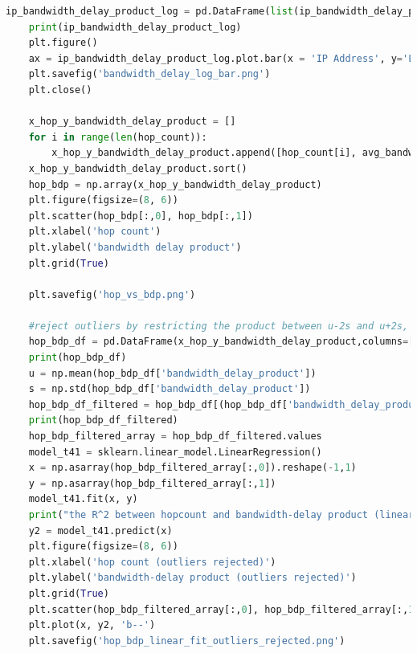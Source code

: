 \documentclass[paper=a4, fontsize=10pt]{scrartcl} %
\numberwithin{equation}{section} %
\numberwithin{figure}{section} %
\numberwithin{table}{section} %
\begin{document}
\begin{lstlisting}[language = python]
    ip_bandwidth_delay_product_log = pd.DataFrame(list(ip_bandwidth_delay_product_log_dic.items()), columns=['IP Address', 'Log of Bandwidth Delay Product(kbps)'])
    print(ip_bandwidth_delay_product_log)
    plt.figure()
    ax = ip_bandwidth_delay_product_log.plot.bar(x = 'IP Address', y='Log of Bandwidth Delay Product(kbps)', fontsize=6, figsize=(15, 15))
    plt.savefig('bandwidth_delay_log_bar.png')
    plt.close()
    
    x_hop_y_bandwidth_delay_product = []
    for i in range(len(hop_count)):
        x_hop_y_bandwidth_delay_product.append([hop_count[i], avg_bandwidth[i]*avg_delay[i]/1000])
    x_hop_y_bandwidth_delay_product.sort()
    hop_bdp = np.array(x_hop_y_bandwidth_delay_product)
    plt.figure(figsize=(8, 6))
    plt.scatter(hop_bdp[:,0], hop_bdp[:,1])
    plt.xlabel('hop count')
    plt.ylabel('bandwidth delay product')
    plt.grid(True)
    
    plt.savefig('hop_vs_bdp.png')
    
    #reject outliers by restricting the product between u-2s and u+2s, of which u is the average product and s is the standard s
    hop_bdp_df = pd.DataFrame(x_hop_y_bandwidth_delay_product,columns=['hop_count', 'bandwidth_delay_product'])
    print(hop_bdp_df)
    u = np.mean(hop_bdp_df['bandwidth_delay_product'])
    s = np.std(hop_bdp_df['bandwidth_delay_product'])
    hop_bdp_df_filtered = hop_bdp_df[(hop_bdp_df['bandwidth_delay_product']>u-2*s)&(hop_bdp_df['bandwidth_delay_product']<u+2*s)]
    print(hop_bdp_df_filtered)
    hop_bdp_filtered_array = hop_bdp_df_filtered.values
    model_t41 = sklearn.linear_model.LinearRegression()
    x = np.asarray(hop_bdp_filtered_array[:,0]).reshape(-1,1)
    y = np.asarray(hop_bdp_filtered_array[:,1])
    model_t41.fit(x, y)
    print("the R^2 between hopcount and bandwidth-delay product (linear regression, outlier rejected) is",model_t41.score(x,y))
    y2 = model_t41.predict(x)
    plt.figure(figsize=(8, 6))
    plt.xlabel('hop count (outliers rejected)')
    plt.ylabel('bandwidth-delay product (outliers rejected)')
    plt.grid(True)
    plt.scatter(hop_bdp_filtered_array[:,0], hop_bdp_filtered_array[:,1])
    plt.plot(x, y2, 'b--')
    plt.savefig('hop_bdp_linear_fit_outliers_rejected.png')
\end{lstlisting}
\end{document}
